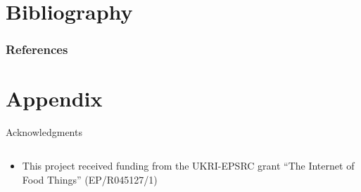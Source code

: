 \documentclass[aspectratio=169]{beamer}
\begin{document}
  \section{Bibliography}

    \begin{frame}[allowframebreaks]
      \frametitle{References}
      
    \end{frame}

  \section{Appendix}


    \begin{frame}{Acknowledgments}
      \begin{columns}
        \begin{column}{0.5\textwidth}
          \begin{itemize}
            \item This project received funding from the UKRI-EPSRC grant “The Internet of Food Things” (EP/R045127/1)
          \end{itemize}
        \end{column}
      \end{columns}
    \end{frame}
\end{document}

